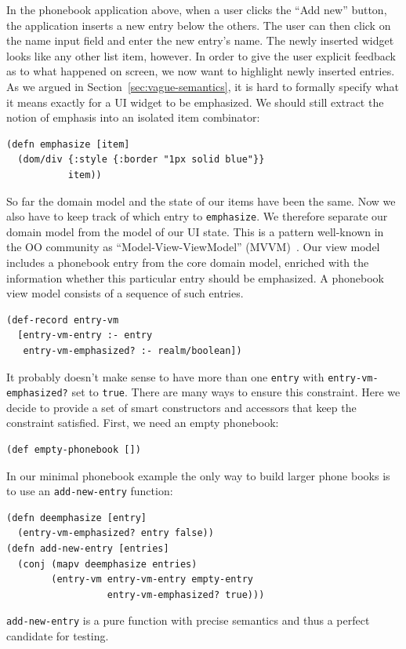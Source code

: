 \documentclass[sigplan,screen]{acmart}
\begin{document}
In the phonebook application above, when a user clicks the ``Add
new'' button, the application inserts a new entry below the others. The user can
then click on the name input field and enter the new entry's name. The
newly inserted widget looks like any other list item, however. In
order to give the user explicit feedback as to what happened on
screen, we now want to highlight newly inserted entries. As we argued
in Section~\ref{sec:vague-semantics}, it is hard to formally specify what it means exactly for a UI
widget to be emphasized. We should still extract the notion of
emphasis into an isolated item combinator:
%
\begin{verbatim}
(defn emphasize [item]
  (dom/div {:style {:border "1px solid blue"}}
           item))
\end{verbatim}
%
So far the domain model and the state of our items have been the same. Now
we also have to keep track of which entry to \texttt{emphasize}. We
therefore separate our domain model from the model of our UI state. This
is a pattern well-known in the OO community
as ``Model-View-ViewModel'' (MVVM)~\cite{MVVM}.
Our view model includes a phonebook entry from the core domain model,
enriched with the information whether this particular entry should be
emphasized. A phonebook view model consists of a sequence of such
entries.
%
\begin{verbatim}
(def-record entry-vm
  [entry-vm-entry :- entry
   entry-vm-emphasized? :- realm/boolean])
\end{verbatim}
%
It probably doesn't make sense to have more than one \texttt{entry} with
\texttt{entry-vm-emphasized?} set to \texttt{true}. There are many ways to
ensure this constraint. Here we decide to provide a set of smart
constructors and accessors that keep the constraint satisfied. First,
we need an empty phonebook:
%
\begin{verbatim}
(def empty-phonebook [])
\end{verbatim}
%
In our minimal phonebook example the only way to build larger phone
books is to use an \texttt{add-new-entry} function:
%
\begin{verbatim}
(defn deemphasize [entry]
  (entry-vm-emphasized? entry false))
(defn add-new-entry [entries]
  (conj (mapv deemphasize entries)
        (entry-vm entry-vm-entry empty-entry
                  entry-vm-emphasized? true)))
\end{verbatim}
%
\texttt{add-new-entry} is a pure function with precise semantics and
thus a perfect candidate for testing.
\end{document}
